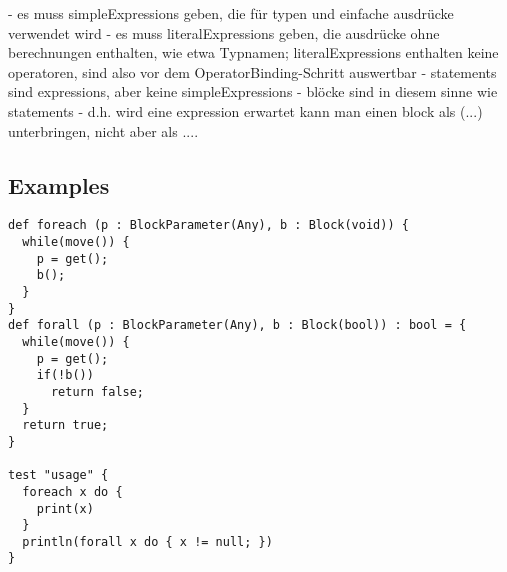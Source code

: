 - es muss simpleExpressions geben, die für typen und einfache ausdrücke verwendet wird
- es muss literalExpressions geben, die ausdrücke ohne berechnungen enthalten, wie etwa Typnamen; literalExpressions enthalten keine operatoren, sind also vor dem OperatorBinding-Schritt auswertbar
- statements sind expressions, aber keine simpleExpressions
- blöcke sind in diesem sinne wie statements
- d.h. wird eine expression erwartet kann man einen block als ({...}) unterbringen, nicht aber als {...}.

\subsection{Examples}

\begin{verbatim}
def foreach (p : BlockParameter(Any), b : Block(void)) {
  while(move()) {
	p = get();
	b();
  }
}
def forall (p : BlockParameter(Any), b : Block(bool)) : bool = {
  while(move()) {
    p = get();
    if(!b())
      return false;
  }
  return true;
}

test "usage" {
  foreach x do {
    print(x)
  }
  println(forall x do { x != null; })
}
\end{verbatim}
